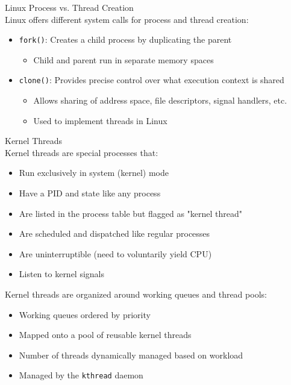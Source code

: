 \begin{definition}{Linux Process vs. Thread Creation}\\
    Linux offers different system calls for process and thread creation:
    \begin{itemize}
        \item \texttt{fork()}: Creates a child process by duplicating the parent
            \begin{itemize}
                \item Child and parent run in separate memory spaces
            \end{itemize}
        \item \texttt{clone()}: Provides precise control over what execution context is shared
            \begin{itemize}
                \item Allows sharing of address space, file descriptors, signal handlers, etc.
                \item Used to implement threads in Linux
            \end{itemize}
    \end{itemize}
\end{definition}

\begin{definition}{Kernel Threads}\\
    Kernel threads are special processes that:
    \begin{itemize}
        \item Run exclusively in system (kernel) mode
        \item Have a PID and state like any process
        \item Are listed in the process table but flagged as "kernel thread"
        \item Are scheduled and dispatched like regular processes
        \item Are uninterruptible (need to voluntarily yield CPU)
        \item Listen to kernel signals
    \end{itemize}
    
    Kernel threads are organized around working queues and thread pools:
    \begin{itemize}
        \item Working queues ordered by priority
        \item Mapped onto a pool of reusable kernel threads
        \item Number of threads dynamically managed based on workload
        \item Managed by the \texttt{kthread} daemon
    \end{itemize}
\end{definition}

